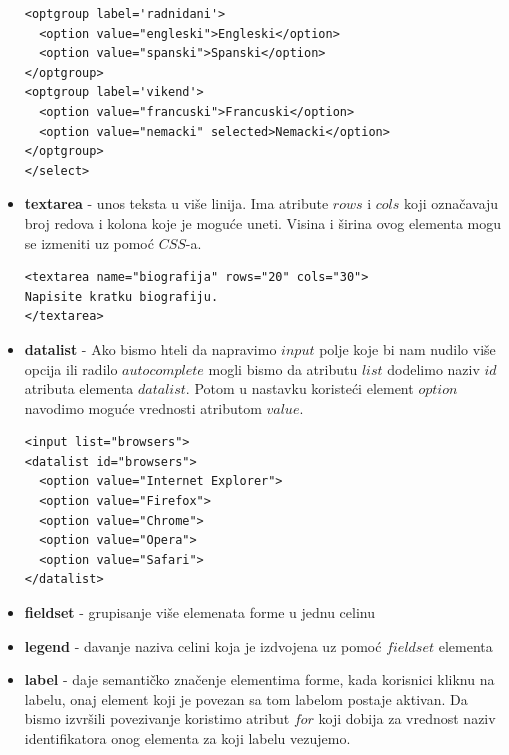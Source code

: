 \begin{itemize}
\begin{lstlisting}[backgroundcolor = \color{lightgray}, breaklines=true]
<optgroup label='radnidani'>
  <option value="engleski">Engleski</option>
  <option value="spanski">Spanski</option>
</optgroup>
<optgroup label='vikend'>  
  <option value="francuski">Francuski</option>
  <option value="nemacki" selected>Nemacki</option>
</optgroup>
</select>
\end{lstlisting}
\item \textbf{textarea} - unos teksta u više linija. Ima atribute $rows$ i $cols$ koji označavaju broj redova i kolona koje je moguće uneti. Visina i širina ovog elementa mogu se izmeniti uz pomoć $CSS$-a.\\
\begin{lstlisting}[backgroundcolor = \color{lightgray}, breaklines=true]
<textarea name="biografija" rows="20" cols="30">
Napisite kratku biografiju.
</textarea>
\end{lstlisting}
\item \textbf{datalist} - Ako bismo hteli da napravimo $input$ polje koje bi nam nudilo više opcija ili radilo $autocomplete$ mogli bismo da atributu $list$ dodelimo naziv $id$ atributa elementa $datalist$. Potom u nastavku koristeći element $option$ navodimo moguće vrednosti atributom $value$.
\begin{lstlisting}[backgroundcolor = \color{lightgray}, breaklines=true] 	 
<input list="browsers">
<datalist id="browsers">
  <option value="Internet Explorer">
  <option value="Firefox">
  <option value="Chrome">
  <option value="Opera">
  <option value="Safari">
</datalist>
\end{lstlisting}
\item \textbf{fieldset} - grupisanje više elemenata forme u jednu celinu
\item \textbf{legend} - davanje naziva celini koja je izdvojena uz pomoć $fieldset$ elementa
\item \textbf{label} - daje semantičko značenje elementima forme, kada korisnici kliknu na labelu, onaj element koji je povezan sa tom labelom postaje aktivan. Da bismo izvršili povezivanje koristimo atribut $for$ koji dobija za vrednost naziv identifikatora onog elementa za koji labelu vezujemo.
\end{itemize}

